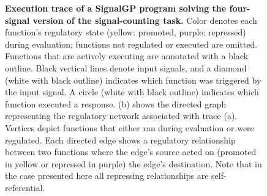 \begin{figure}[ht]
\caption{\small 
   \textbf{Execution trace of a SignalGP program solving the four-signal version of the signal-counting task.}
    Color denotes each function's regulatory state (yellow: promoted, purple: repressed) during evaluation; functions not regulated or executed are omitted.
    Functions that are actively executing are annotated with a black outline.
    Black vertical lines denote input signals, and a diamond (white with black outline) indicates which function was triggered by the input signal.
    A circle (white with black outline) indicates which function executed a response.
    (b) shows the directed graph representing the regulatory network associated with trace (a).
    Vertices depict functions that either ran during evaluation or were regulated. 
    Each directed edge shows a regulatory relationship between two functions where the edge's source acted on (promoted in yellow or repressed in purple) the edge's destination.
    Note that in the case presented here all repressing relationships are self-referential.
    }
    
\label{chapter:tag-based-regulation:fig:signal-counting-example-networks}
\end{figure}
